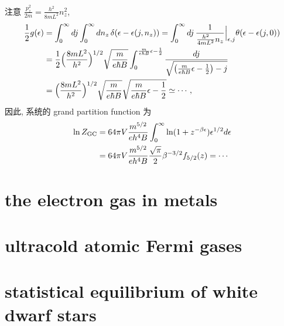 \begin{itemize}
	\begin{tcolorbox}[title=calculation:]
		注意 $\frac{p_z^2}{2 m} = \frac{h^2}{8 m L^2} n_z^2$,
		\begin{align}
			\frac{1}{2} g(\epsilon) &= \int_0^\infty dj \int_0^\infty dn_z \, \delta(\epsilon - \epsilon(j, n_z)) = \int_0^\infty dj \, \frac{1}{\frac{h^2}{4 m L^2} n_z} \Big|_{\epsilon, j} \theta(\epsilon - \epsilon(j, 0)) \notag \\
			&= \frac{1}{2} \Big( \frac{8 m L^2}{h^2} \Big)^{1 / 2} \sqrt{\frac{m}{e \hbar B}} \int_0^{\frac{m}{e \hbar B} \epsilon - \frac{1}{2}} \frac{dj}{\sqrt{\big( \frac{m}{e \hbar B} \epsilon - \frac{1}{2} \big) - j}} \notag \\
			&= \Big( \frac{8 m L^2}{h^2} \Big)^{1 / 2} \sqrt{\frac{m}{e \hbar B}} \sqrt{\frac{m}{e \hbar B} \epsilon - \frac{1}{2}} \simeq \cdots,
		\end{align}
		因此, 系统的 grand partition function 为
		\begin{align}
			\ln Z_\text{GC} &=  64 \pi V \frac{m^{5 / 2}}{e h^4 B} \int_0^\infty \ln(1 + z^{- \beta \epsilon}) \epsilon^{1 / 2} d\epsilon \notag \\
			&= 64 \pi V \frac{m^{5 / 2}}{e h^4 B} \frac{\sqrt{\pi}}{2} \beta^{- 3 / 2} f_{5 / 2}(z) = \cdots
		\end{align}
	\end{tcolorbox}
\end{itemize}

\section{the electron gas in metals}

\section{ultracold atomic Fermi gases}

\section{statistical equilibrium of white dwarf stars}
